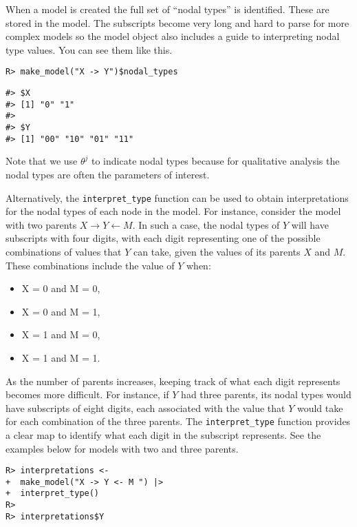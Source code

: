\documentclass[
  11pt,
  article]{jss}
\providecommand{\tightlist}{%
  \setlength{\itemsep}{0pt}\setlength{\parskip}{0pt}}\usepackage{longtable,booktabs,array}
\begin{document}
When a model is created the full set of ``nodal types'' is identified.
These are stored in the model. The subscripts become very long and hard
to parse for more complex models so the model object also includes a
guide to interpreting nodal type values. You can see them like this.

\begin{verbatim}
R> make_model("X -> Y")$nodal_types
\end{verbatim}

\begin{verbatim}
#> $X
#> [1] "0" "1"
#> 
#> $Y
#> [1] "00" "10" "01" "11"
\end{verbatim}

Note that we use \(\theta^j\) to indicate nodal types because for
qualitative analysis the nodal types are often the parameters of
interest.

Alternatively, the \texttt{interpret\_type} function can be used to
obtain interpretations for the nodal types of each node in the model.
For instance, consider the model with two parents
\(X \rightarrow Y \leftarrow M.\) In such a case, the nodal types of
\(Y\) will have subscripts with four digits, with each digit
representing one of the possible combinations of values that \(Y\) can
take, given the values of its parents \(X\) and \(M.\) These
combinations include the value of \(Y\) when:

\begin{itemize}
\tightlist
\item
  X = 0 and M = 0,
\item
  X = 0 and M = 1,
\item
  X = 1 and M = 0,
\item
  X = 1 and M = 1.
\end{itemize}

As the number of parents increases, keeping track of what each digit
represents becomes more difficult. For instance, if \(Y\) had three
parents, its nodal types would have subscripts of eight digits, each
associated with the value that \(Y\) would take for each combination of
the three parents. The \texttt{interpret\_type} function provides a
clear map to identify what each digit in the subscript represents. See
the examples below for models with two and three parents.

\begin{verbatim}
R> interpretations <- 
+  make_model("X -> Y <- M ") |> 
+  interpret_type()
R> 
R> interpretations$Y
\end{verbatim}
\end{document}
